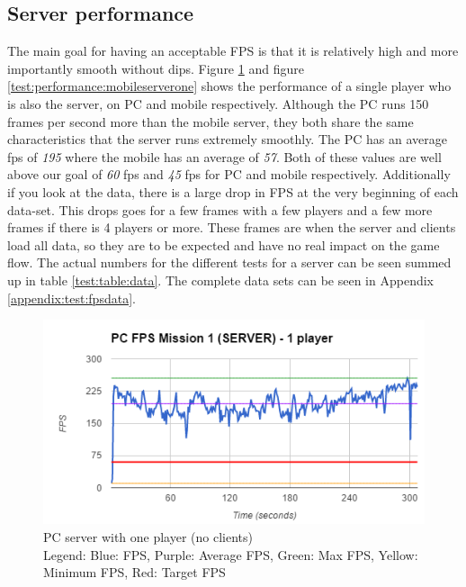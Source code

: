 \subsection*{Server performance}
The main goal for having an acceptable FPS is that it is relatively high and more importantly smooth without dips. Figure \ref{test:performance:pcserverone} and figure \ref{test:performance:mobileserverone} shows the performance of a single player who is also the server, on PC and mobile respectively. Although the PC runs 150 frames per second more than the mobile server, they both share the same characteristics that the server runs extremely smoothly. The PC has an average fps of \emph{195} where the mobile has an average of \emph{57}. Both of these values are well above our goal of \emph{60} fps and \emph{45} fps for PC and mobile respectively. Additionally if you look at the data, there is a large drop in FPS at the very beginning of each data-set. This drops goes for a few frames with a few players and a few more frames if there is 4 players or more. These frames are when the server and clients load all data, so they are to be expected and have no real impact on the game flow. The actual numbers for the different tests for a server can be seen summed up in table \ref{test:table:data}. The complete data sets can be seen in Appendix \ref{appendix:test:fpsdata}.
\begin{figure}
    \includegraphics{figures/test/PCServerOnePlayer}
    \caption{PC server with one player (no clients) \\ Legend: Blue: FPS, Purple: Average FPS, Green: Max FPS, Yellow: Minimum FPS, Red: Target FPS}
    \label{test:performance:pcserverone}
\end{figure}

